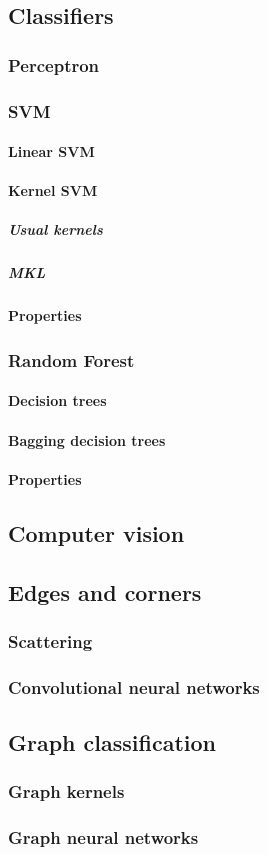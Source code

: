     \subsection{Classifiers}
        \subsubsection{Perceptron}
        \subsubsection{SVM}
            \paragraph{Linear SVM}
            \paragraph{Kernel SVM}
                \subparagraph{Usual kernels}
                \subparagraph{MKL}
            \paragraph{Properties}
        \subsubsection{Random Forest}
            \paragraph{Decision trees}
            \paragraph{Bagging decision trees}
            \paragraph{Properties}
    \subsection{Computer vision}
        \subsection{Edges and corners}
        \subsubsection{Scattering}
        \subsubsection{Convolutional neural networks}
    \subsection{Graph classification}
        \subsubsection{Graph kernels}
        \subsubsection{Graph neural networks}

